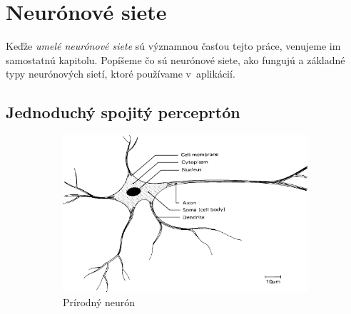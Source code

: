 
\chapter{Neurónové siete}\label{chap:neuralnet}

Keďže \textit{umelé neurónové siete} sú významnou časťou tejto práce, venujeme im samostatnú kapitolu. Popíšeme čo sú neurónové siete, ako fungujú a základné typy neurónových sietí, ktoré používame v~aplikácií.
\bigskip

\section{Jednoduchý spojitý perceprtón}

\begin{figure}[hp]
  \begin{center}
    \begin{subfigure}[b]{0.6\textwidth}
      \centering
      \includegraphics[width=\textwidth]{images/bio_neuron}
      \caption{Prírodný neurón}
      \label{fig:bio_neuron}
    \end{subfigure}
    \begin{subfigure}[b]{0.3\textwidth}
      \centering

\end{subfigure}
\end{center}
\end{figure}
